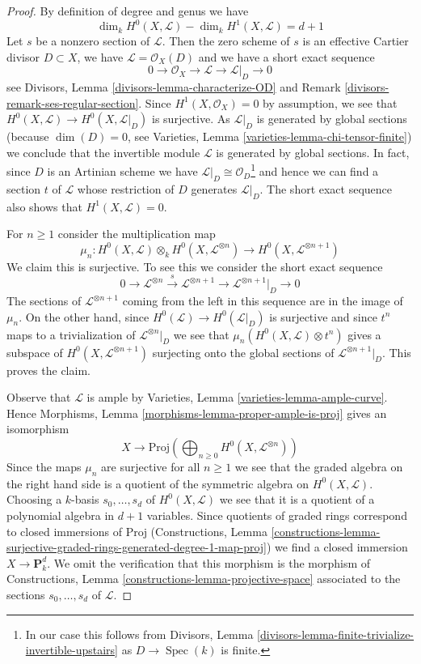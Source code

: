 \documentclass[10pt,a4paper]{amsart}
\theoremstyle{plain}
\theoremstyle{definition}
\theoremstyle{remark}
\numberwithin{equation}{subsection}
\def\Spec{\mathop{\mathrm{Spec}}}
\begin{document}
\begin{proof}
By definition of degree and genus we have
$$
\dim_k H^0(X, \mathcal{L}) - \dim_k H^1(X, \mathcal{L}) = d + 1
$$
Let $s$ be a nonzero section of $\mathcal{L}$.
Then the zero scheme of $s$ is an effective Cartier
divisor $D \subset X$, we have $\mathcal{L} = \mathcal{O}_X(D)$ and
we have a short exact sequence
$$
0 \to \mathcal{O}_X \to \mathcal{L} \to \mathcal{L}|_D \to 0
$$
see Divisors, Lemma \ref{divisors-lemma-characterize-OD} and
Remark \ref{divisors-remark-ses-regular-section}.
Since $H^1(X, \mathcal{O}_X) = 0$ by assumption, we see that
$H^0(X, \mathcal{L}) \to H^0(X, \mathcal{L}|_D)$ is surjective.
As $\mathcal{L}|_D$ is generated by global sections
(because $\dim(D) = 0$, see
Varieties, Lemma \ref{varieties-lemma-chi-tensor-finite})
we conclude that the invertible module $\mathcal{L}$
is generated by global sections.
In fact, since $D$ is an Artinian scheme we have
$\mathcal{L}|_D \cong \mathcal{O}_D$\footnote{In our case this
follows from Divisors, Lemma
\ref{divisors-lemma-finite-trivialize-invertible-upstairs}
as $D \to \Spec(k)$ is finite.} and hence we can
find a section $t$ of $\mathcal{L}$ whose restriction
of $D$ generates $\mathcal{L}|_D$.
The short exact sequence also shows that $H^1(X, \mathcal{L}) = 0$.

\medskip\noindent
For $n \geq 1$ consider the multiplication map
$$
\mu_n :
H^0(X, \mathcal{L}) \otimes_k H^0(X, \mathcal{L}^{\otimes n})
\longrightarrow
H^0(X, \mathcal{L}^{\otimes n + 1})
$$
We claim this is surjective. To see this we consider the short exact
sequence
$$
0 \to \mathcal{L}^{\otimes n} \xrightarrow{s}
\mathcal{L}^{\otimes n + 1} \to \mathcal{L}^{\otimes n + 1}|_D \to 0
$$
The sections of $\mathcal{L}^{\otimes n + 1}$ coming from the left in this
sequence are in the image of $\mu_n$. On the other hand, since
$H^0(\mathcal{L}) \to H^0(\mathcal{L}|_D)$ is surjective and since
$t^n$ maps to a trivialization of $\mathcal{L}^{\otimes n}|_D$
we see that $\mu_n(H^0(X, \mathcal{L}) \otimes t^n)$ gives a subspace
of $H^0(X, \mathcal{L}^{\otimes n + 1})$ surjecting onto the global sections of
$\mathcal{L}^{\otimes n + 1}|_D$. This proves the claim.

\medskip\noindent
Observe that $\mathcal{L}$ is ample by
Varieties, Lemma \ref{varieties-lemma-ample-curve}.
Hence
Morphisms, Lemma \ref{morphisms-lemma-proper-ample-is-proj}
gives an isomorphism
$$
X \longrightarrow
\text{Proj}\left(
\bigoplus\nolimits_{n \geq 0} H^0(X, \mathcal{L}^{\otimes n})\right)
$$
Since the maps $\mu_n$ are surjective for all $n \geq 1$ we see that
the graded algebra on the right hand side is a quotient of
the symmetric algebra on $H^0(X, \mathcal{L})$. Choosing a $k$-basis
$s_0, \ldots, s_d$ of $H^0(X, \mathcal{L})$ we see that
it is a quotient of a polynomial algebra in $d + 1$ variables.
Since quotients of graded rings correspond to closed immersions
of $\text{Proj}$ (Constructions, Lemma
\ref{constructions-lemma-surjective-graded-rings-generated-degree-1-map-proj})
we find a closed immersion $X \to \mathbf{P}^d_k$. We omit the
verification that this morphism is the morphism of
Constructions, Lemma \ref{constructions-lemma-projective-space}
associated to the sections $s_0, \ldots, s_d$ of $\mathcal{L}$.
\end{proof}
\end{document}
